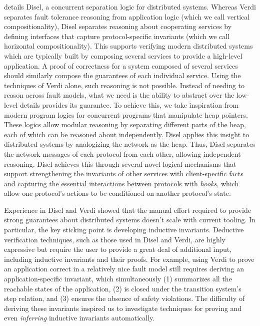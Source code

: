 

 details Disel, a concurrent separation logic for distributed
systems.  Whereas Verdi separates fault tolerance reasoning from
application logic (which we call vertical compositionality), Disel
separates reasoning about cooperating services by defining interfaces
that capture protocol-specific invariants (which we call horizontal
compositionality).  This supports verifying modern distributed systems
which are typically built by composing several services to provide a
high-level application.  A proof of correctness for a system composed
of several services should similarly compose the guarantees of each
individual service. Using the techniques of Verdi alone, such reasoning
is not possible. Instead of needing to reason across fault models,
what we need is the ability to abstract over the low-level details
provides its guarantee. To achieve this, we take inspiration from
modern program logics for concurrent programs that manipulate
heap pointers. These logics allow modular reasoning by separating
different parts of the heap, each of which can be reasoned about
independently. Disel applies this insight to distributed systems
by analogizing the network as the heap. Thus, Disel separates
the network messages of each protocol from each other, allowing
independent reasoning. Disel achieves this through several
novel logical mechanisms that support strengthening the invariants
of other services with client-specific facts and capturing the
essential interactions between protocols with \emph{hooks}, which
allow one protocol's actions to be conditioned on another protocol's
state.

Experience in Disel and Verdi showed that the manual effort required
to provide strong guarantees about distributed systems doesn't scale
with current tooling.  In particular, the key sticking point is
developing inductive invariants.  Deductive verification techniques,
such as those used in Disel and Verdi, are highly expressive but
require the user to provide a great deal of additional input,
including inductive invariants and their proofs. For example, using
Verdi to prove an application correct in a relatively nice fault model
still requires deriving an application-specific invariant, which
simultaneously (1) summarizes all the reachable states of the
application, (2) is closed under the transition system's step
relation, and (3) ensures the absence of safety violations.
The difficulty of deriving these invariants inspired us to
investigate techniques for proving and even \emph{inferring}
inductive invariants automatically.

